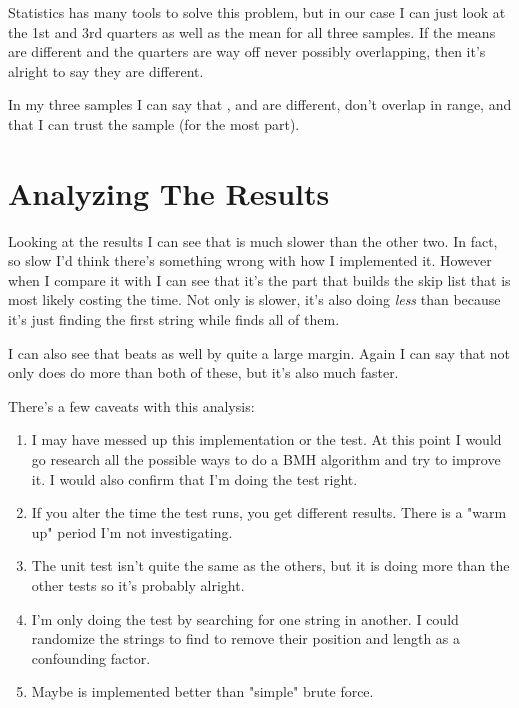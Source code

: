 Statistics has many tools to solve this problem, but in our case I can just
look at the 1st and 3rd quarters as well as the mean for all three samples.  If
the means are different and the quarters are way off never possibly
overlapping, then it's alright to say they are different.

In my three samples I can say that ,  and
 are different, don't overlap in range, and that I can trust the
sample (for the most part).


\section{Analyzing The Results}

Looking at the results I can see that  is much slower than
the other two.  In fact, so slow I'd think there's something wrong with how I
implemented it.  However when I compare it with  I
can see that it's the part that builds the skip list that is most likely
costing the time.  Not only is  slower, it's also doing \emph{less}
than  because it's just finding the first string while 
finds all of them.

I can also see that  beats  as well by quite a large
margin.  Again I can say that not only does  do more than both of
these, but it's also much faster.

There's a few caveats with this analysis:

\begin{enumerate}
\item I may have messed up this implementation or the test. At this
    point I would go research all the possible ways to do a BMH algorithm
    and try to improve it.  I would also confirm that I'm doing the test
    right.
\item If you alter the time the test runs, you get different results.
    There is a "warm up" period I'm not investigating.
\item The  unit test isn't quite the
    same as the others, but it is doing more than the other tests so
    it's probably alright.
\item I'm only doing the test by searching for one string in another.
    I could randomize the strings to find to remove their position
    and length as a confounding factor.
\item Maybe  is implemented better than "simple" brute force.
\end{enumerate}

